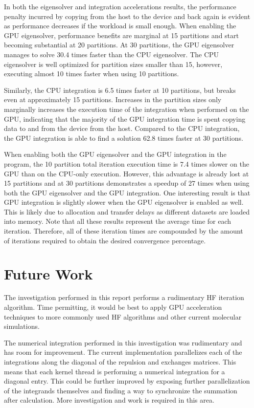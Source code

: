 \documentclass[conference, twoside]{IEEEtran}
\begin{document}
In both the eigensolver and integration accelerations results, the performance penalty incurred by copying from the host to the device and back again is evident as performance decreases if the workload is small enough. When enabling the GPU eigensolver, performance benefits are marginal at 15 partitions and start becoming substantial at 20 partitions. At 30 partitions, the GPU eigensolver manages to solve 30.4 times faster than the CPU eigensolver. The CPU eigensolver is well optimized for partition sizes smaller than 15, however, executing almost 10 times faster when using 10 partitions.

Similarly, the CPU integration is 6.5 times faster at 10 partitions, but breaks even at approximately 15 partitions. Increases in the partition sizes only marginally increases the execution time of the integration when performed on the GPU, indicating that the majority of the GPU integration time is spent copying data to and from the device from the host. Compared to the CPU integration, the GPU integration is able to find a solution 62.8 times faster at 30 partitions.

When enabling both the GPU eigensolver and the GPU integration in the program, the 10 partition total iteration execution time is 7.4 times slower on the GPU than on the CPU-only execution. However, this advantage is already lost at 15 partitions and at 30 partitions demonstrates a speedup of 27 times when using both the GPU eigensolver and the GPU integration. One interesting result is that GPU integration is slightly slower when the GPU eigensolver is enabled as well. This is likely due to allocation and transfer delays as different datasets are loaded into memory. Note that all these results represent the average time for each iteration. Therefore, all of these iteration times are compounded by the amount of iterations required to obtain the desired convergence percentage.

\section{Future Work} %

The investigation performed in this report performs a rudimentary HF iteration algorithm. Time permitting, it would be best to apply GPU acceleration techniques to more commonly used HF algorithms and other current molecular simulations.

The numerical integration performed in this investigation was rudimentary and has room for improvement. The current implementation parallelizes each of the integrations along the diagonal of the repulsion and exchanges matrices. This means that each kernel thread is performing a numerical integration for a diagonal entry. This could be further improved by exposing further parallelization of the integrands themselves and finding a way to synchronize the summation after calculation. More investigation and work is required in this area.
\end{document}
